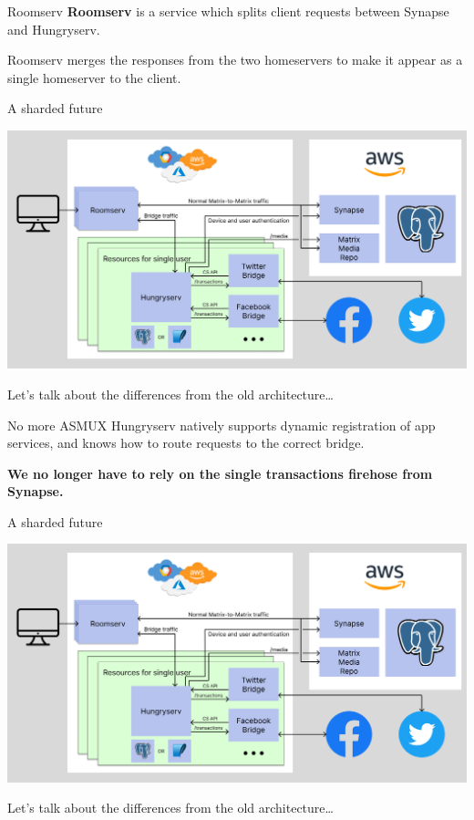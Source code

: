 \documentclass{beeper}
\begin{document}
\begin{frame}{Roomserv}
    \textbf{Roomserv} is a service which splits client requests between Synapse
    and Hungryserv.

    Roomserv merges the responses from the two homeservers to make it appear as
    a single homeserver to the client.
\end{frame}

\begin{frame}{A sharded future}
    \centerline{\includegraphics[width=1.15\textwidth]{images/new-architecture}}

    Let's talk about the differences from the old architecture\ldots
\end{frame}

\begin{frame}{No more ASMUX}
    Hungryserv natively supports dynamic registration of app services, and knows
    how to route requests to the correct bridge.
    \pause

    \textbf{We no longer have to rely on the single transactions firehose from
    Synapse.}
\end{frame}

\begin{frame}{A sharded future}
    \centerline{\includegraphics[width=1.15\textwidth]{images/new-architecture}}

    Let's talk about the differences from the old architecture\ldots
\end{frame}
\end{document}
